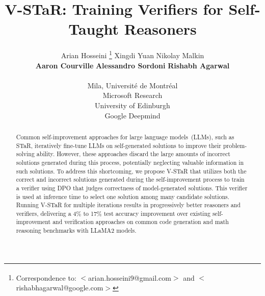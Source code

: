 \documentclass{article} %
\title{V-STaR: Training Verifiers for Self-Taught Reasoners}
\author{Arian Hosseini    \milalogo \textsuperscript{}\thanks{\textsuperscript{}Correspondence to: $<$arian.hosseini9@gmail.com$>$ and
$<$rishabhagarwal@google.com$>$}   \quad Xingdi Yuan \msrlogo \quad Nikolay Malkin \milalogo\uelogo\\\textbf{Aaron Courville} \milalogo \quad \textbf{Alessandro Sordoni} \milalogo\msrlogo \quad \textbf{Rishabh Agarwal} \gdmlogo \\\\
\milalogo Mila, Universit\'e de Montr\'eal\\
\msrlogo Microsoft Research\\
\uelogo University of Edinburgh\\
\gdmlogo Google Deepmind\\
}
\makeatletter
\def\subsection{\@startsection{subsection}{2}{\z@}{-1.0ex plus
-0.5ex minus -.2ex}{0.5ex plus .2ex}{\normalsize\bf\raggedright}}
\newcommand{\vstar}{V-STaR}
\makeatother
\begin{document}
\maketitle

\begin{abstract}
Common self-improvement approaches for large language models~(LLMs), such as STaR, iteratively fine-tune  LLMs on self-generated solutions to improve their problem-solving ability. However, these approaches discard the large amounts of incorrect solutions generated during this process, potentially neglecting valuable information in such solutions. To address this shortcoming, we propose \vstar{} that utilizes both the correct and incorrect solutions generated during the self-improvement process to train a verifier using DPO that judges correctness of model-generated solutions. This verifier is used at inference time to select one solution among many candidate solutions. Running \vstar{} for multiple iterations results in progressively better reasoners and verifiers, delivering a 4\% to 17\% test accuracy improvement over existing self-improvement and verification approaches on common code generation and math reasoning benchmarks with LLaMA2 models.
\end{abstract}









\end{document}
